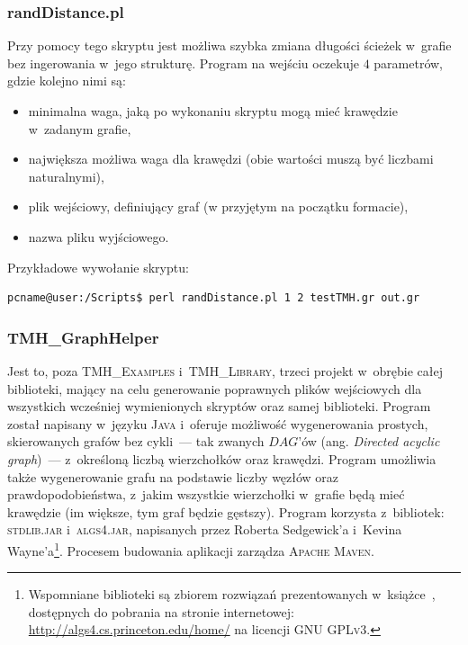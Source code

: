 \subsubsection{randDistance.pl}


Przy pomocy tego skryptu jest możliwa szybka zmiana długości ścieżek w~grafie bez ingerowania w~jego strukturę.
Program na wejściu oczekuje $4$ parametrów, gdzie kolejno nimi są:

\begin{itemize}
	\item minimalna waga, jaką po wykonaniu skryptu mogą mieć krawędzie w~zadanym grafie,
	\item największa możliwa waga dla krawędzi (obie wartości muszą być liczbami naturalnymi),
	\item plik wejściowy, definiujący graf (w przyjętym na początku formacie),
	\item nazwa pliku wyjściowego.
\end{itemize}

Przykładowe wywołanie skryptu:

\begin{lstlisting}[language=bash]
pcname@user:/Scripts$ perl randDistance.pl 1 2 testTMH.gr out.gr
\end{lstlisting}


\subsubsection{TMH\_GraphHelper}


Jest to, poza \textsc{TMH\_Examples} i~\textsc{TMH\_Library}, trzeci projekt w~obrębie całej biblioteki, mający na celu generowanie poprawnych plików wejściowych dla wszystkich wcześniej wymienionych skryptów oraz samej biblioteki.
Program został napisany w~języku \textsc{Java} i~oferuje możliwość wygenerowania prostych, skierowanych grafów bez cykli~--- tak zwanych $DAG$'ów (ang. \textit{Directed acyclic graph})~--- z~określoną liczbą wierzchołków oraz krawędzi.
Program umożliwia także wygenerowanie grafu na podstawie liczby węzłów oraz prawdopodobieństwa, z~jakim wszystkie wierzchołki w~grafie będą mieć krawędzie (im większe, tym graf będzie gęstszy).
Program korzysta z~bibliotek: \textsc{stdlib.jar} i~\textsc{algs4.jar}, napisanych przez Roberta Sedgewick'a i~Kevina Wayne'a\footnote{
	Wspomniane biblioteki są zbiorem rozwiązań prezentowanych w~książce~\cite{books/daglib/0029345}, dostępnych do pobrania na stronie internetowej: \url{http://algs4.cs.princeton.edu/home/} na licencji \textsc{GNU GPLv3}.
}.
Procesem budowania aplikacji zarządza \textsc{Apache Maven}.

